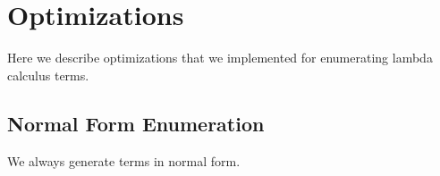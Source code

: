 \section{Optimizations} \label{sec:optimizations}
Here we describe optimizations that we implemented for enumerating lambda
  calculus terms.

\subsection{Normal Form Enumeration}
We always generate terms in normal form.
